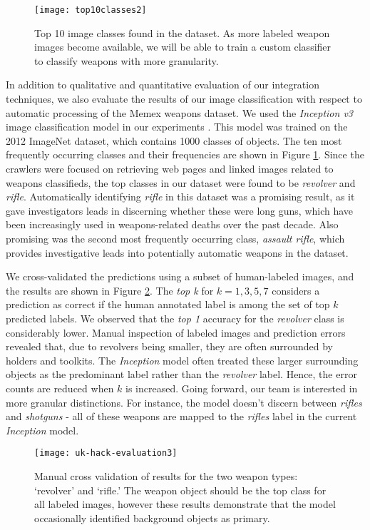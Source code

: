 \begin{figure}
	\texttt{[image: top10classes2]}
	\caption{Top 10 image classes found in the dataset. As more labeled weapon images become available, we will be able to train a custom classifier to classify weapons with more granularity.}
	\label{fig:top10ImgClass}
\end{figure}


In addition to qualitative and quantitative evaluation of our integration techniques, we also evaluate the results of our image classification with respect to automatic processing of the Memex weapons dataset.  We used the \textit{Inception v3} image classification model in our experiments \cite{SzegedyVISW15}. This model was trained on the 2012 ImageNet dataset, which contains 1000 classes of objects\cite{ILSVRC15}. The ten most frequently occurring classes and their frequencies are shown in Figure \ref{fig:top10ImgClass}. Since the crawlers were focused on retrieving web pages and linked images related to weapons classifieds, the top classes in our dataset were found to be \textit{revolver} and \textit{rifle}. Automatically identifying \textit{rifle} in this dataset was a promising result, as it gave investigators leads in discerning whether these were long guns, which have been increasingly used in weapons-related deaths over the past decade. Also promising was the second most frequently occurring class, \textit{assault rifle}, which provides investigative leads into potentially automatic weapons in the dataset.

We cross-validated the predictions using a subset of human-labeled images, and the results are shown in Figure \ref{fig:uk-hack-eval}. The \textit{top k} for $k=1,3,5,7$ considers a prediction as correct if the human annotated label is among the set of top $k$  predicted labels. We observed that the \textit{top 1} accuracy for the \textit{revolver} class is considerably lower. Manual inspection of labeled images and prediction errors revealed that, due to revolvers being smaller, they are often surrounded by holders and toolkits. The \textit{Inception} model often treated these larger surrounding objects as the predominant label rather than the \textit{revolver} label. Hence, the error counts are reduced when $k$ is increased. Going forward, our team is interested in more granular distinctions. For instance, the model doesn't discern between \textit{rifles} and \textit{shotguns} - all of these weapons are mapped to the \textit{rifles} label in the current \textit{Inception} model. 

\begin{figure}
	\texttt{[image: uk-hack-evaluation3]}
	\caption{Manual cross validation of results for the two weapon types: `revolver' and `rifle.' The weapon object should be the top class for all labeled images, however these results demonstrate that the model occasionally identified background objects as primary.}
	\label{fig:uk-hack-eval}
\end{figure}

